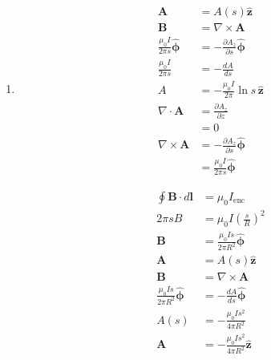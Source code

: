 \documentclass{article}
\renewcommand{\vec}[1]{\boldsymbol{\mathbf{#1}}}
\newcommand{\uvec}[1]{\hat{\vec{#1}}}
\begin{document}
\begin{enumerate}
  \item

        \begin{align*}
          \vec{A}                             & = A(s) \uvec{z}                                \\
          \vec{B}                             & = \nabla \times \vec{A}                        \\
          \frac{\mu_0 I}{2 \pi s} \uvec{\phi} & = -\frac{\partial A_z}{\partial s} \uvec{\phi} \\
          \frac{\mu_0 I}{2 \pi s}             & = -\frac{d A}{d s}                             \\
          A                                   & = -\frac{\mu_0 I}{2 \pi} \ln s \,\uvec{z}      \\
          \nabla \cdot \vec{A}                & = \frac{\partial A_z}{\partial z}              \\
                                              & = 0                                            \\
          \nabla \times \vec{A}               & = -\frac{\partial A_z}{\partial s} \uvec{\phi} \\
                                              & = \frac{\mu_0 I}{2 \pi s} \uvec{\phi}
        \end{align*}

        \begin{align*}
          \oint \vec{B} \cdot d \vec{l}           & = \mu_0 I_\text{enc}                      \\
          2 \pi s B                               & = \mu_0 I \left( \frac{s}{R} \right)^2    \\
          \vec{B}                                 & = \frac{\mu_0 I s}{2 \pi R^2} \uvec{\phi} \\
          \vec{A}                                 & = A(s) \uvec{z}                           \\
          \vec{B}                                 & = \nabla \times \vec{A}                   \\
          \frac{\mu_0 I s}{2 \pi R^2} \uvec{\phi} & = -\frac{d A}{d s} \uvec{\phi}            \\
          A(s)                                    & = -\frac{\mu_0 I s^2}{4 \pi R^2}          \\
          \vec{A}                                 & = -\frac{\mu_0 I s^2}{4 \pi R^2} \uvec{z}
        \end{align*}
\end{enumerate}
\end{document}
